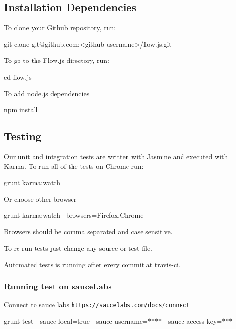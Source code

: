 \subsection*{Installation Dependencies}


\begin{DoxyEnumerate}
\item To clone your Github repository, run\+: 
\begin{DoxyCode}
git clone git@github.com:<github username>/flow.js.git
\end{DoxyCode}

\item To go to the Flow.\+js directory, run\+: 
\begin{DoxyCode}
cd flow.js
\end{DoxyCode}

\item To add node.\+js dependencies 
\begin{DoxyCode}
npm install
\end{DoxyCode}
 \subsection*{Testing}
\end{DoxyEnumerate}

Our unit and integration tests are written with Jasmine and executed with Karma. To run all of the tests on Chrome run\+: 
\begin{DoxyCode}
grunt karma:watch
\end{DoxyCode}
 Or choose other browser 
\begin{DoxyCode}
grunt karma:watch --browsers=Firefox,Chrome
\end{DoxyCode}
 Browsers should be comma separated and case sensitive.

To re-\/run tests just change any source or test file.

Automated tests is running after every commit at travis-\/ci.

\subsubsection*{Running test on sauce\+Labs}


\begin{DoxyEnumerate}
\item Connect to sauce labs \href{https://saucelabs.com/docs/connect}{\tt https\+://saucelabs.\+com/docs/connect}
\item {\ttfamily grunt test -\/-\/sauce-\/local=true -\/-\/sauce-\/username=$\ast$$\ast$$\ast$$\ast$ -\/-\/sauce-\/access-\/key=$\ast$$\ast$$\ast$}
\end{DoxyEnumerate}

